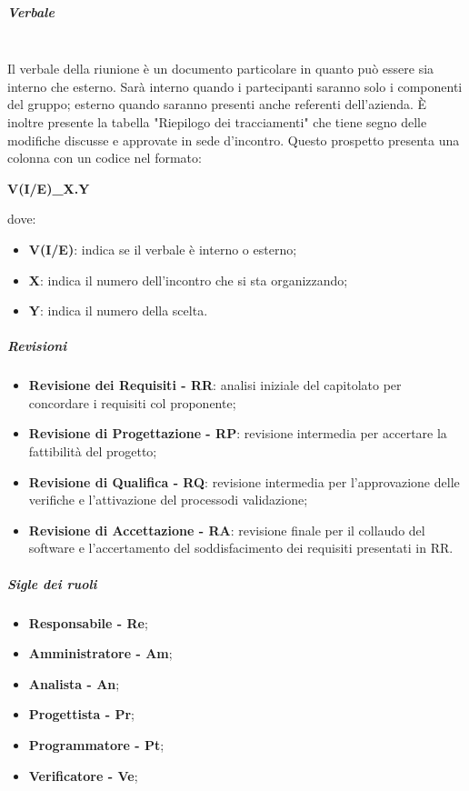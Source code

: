                 \subparagraph{Verbale}\mbox{}\\ [1mm]
                    Il verbale della riunione è un documento particolare in quanto può essere sia interno che esterno. Sarà interno quando
                    i partecipanti saranno solo i componenti del gruppo; esterno quando saranno presenti anche referenti dell'azienda.
                    È inoltre presente la tabella "Riepilogo dei tracciamenti" che tiene segno delle modifiche discusse e
                    approvate in sede d'incontro. Questo prospetto presenta una colonna con un codice nel formato: \newline \newline
                    \centerline{\textbf{V(I/E)\_X.Y}} \newline \newline
                    dove:
                    \begin{itemize}
                        \item \textbf{V(I/E)}: indica se il verbale è interno o esterno;
                        \item \textbf{X}: indica il numero dell'incontro che si sta organizzando;
                        \item \textbf{Y}: indica il numero della scelta.
                    \end{itemize}
                \subparagraph{Revisioni}
                \begin{itemize}
                    \item \textbf{Revisione dei Requisiti - RR}: analisi iniziale del capitolato per concordare i requisiti col proponente;
                    \item \textbf{Revisione di Progettazione - RP}: revisione intermedia per accertare la fattibilità del progetto\glo;
                    \item \textbf{Revisione di Qualifica - RQ}: revisione intermedia per l'approvazione delle verifiche e l'attivazione del processo\glosp di validazione\glo;
                    \item \textbf{Revisione di Accettazione - RA}: revisione finale per il collaudo del software e l'accertamento del soddisfacimento dei requisiti presentati in RR.
                \end{itemize}
                \subparagraph{Sigle dei ruoli}
                    \begin{itemize}
                        \item \textbf{Responsabile - Re};
                        \item \textbf{Amministratore - Am};
                        \item \textbf{Analista - An};
                        \item \textbf{Progettista - Pr};
                        \item \textbf{Programmatore - Pt};
                        \item \textbf{Verificatore - Ve};
                    \end{itemize}

